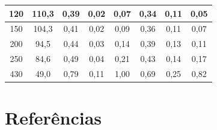 \documentclass[12pt, a4paper, oneside]{article}
\begin{document}
\begin{table}[h!]
{\begin{tabular}{cccccccc}
\multicolumn{1}{|c|}{120}                             & \multicolumn{1}{c|}{110,3}                          & \multicolumn{1}{c|}{0,39}                       & \multicolumn{1}{c|}{0,02}                        & \multicolumn{1}{c|}{0,07}                        & \multicolumn{1}{c|}{0,34}                       & \multicolumn{1}{c|}{0,11}                        & \multicolumn{1}{c|}{0,05}                        \\ \hline
\multicolumn{1}{|c|}{150}                             & \multicolumn{1}{c|}{104,3}                          & \multicolumn{1}{c|}{0,41}                       & \multicolumn{1}{c|}{0,02}                        & \multicolumn{1}{c|}{0,09}                        & \multicolumn{1}{c|}{0,36}                       & \multicolumn{1}{c|}{0,11}                        & \multicolumn{1}{c|}{0,07}                        \\ \hline
\multicolumn{1}{|c|}{200}                             & \multicolumn{1}{c|}{94,5}                           & \multicolumn{1}{c|}{0,44}                       & \multicolumn{1}{c|}{0,03}                        & \multicolumn{1}{c|}{0,14}                        & \multicolumn{1}{c|}{0,39}                       & \multicolumn{1}{c|}{0,13}                        & \multicolumn{1}{c|}{0,11}                        \\ \hline
\multicolumn{1}{|c|}{250}                             & \multicolumn{1}{c|}{84,6}                           & \multicolumn{1}{c|}{0,49}                       & \multicolumn{1}{c|}{0,04}                        & \multicolumn{1}{c|}{0,21}                        & \multicolumn{1}{c|}{0,43}                       & \multicolumn{1}{c|}{0,14}                        & \multicolumn{1}{c|}{0,17}                        \\ \hline
\multicolumn{1}{|c|}{430}                             & \multicolumn{1}{c|}{49,0}                           & \multicolumn{1}{c|}{0,79}                       & \multicolumn{1}{c|}{0,11}                        & \multicolumn{1}{c|}{1,00}                        & \multicolumn{1}{c|}{0,69}                       & \multicolumn{1}{c|}{0,25}                        & \multicolumn{1}{c|}{0,82}                        \\ \hline
\end{tabular}}
\end{table}


\section{Referências}
\renewcommand\refname{\vspace{-1.5cm}}

\end{document}
